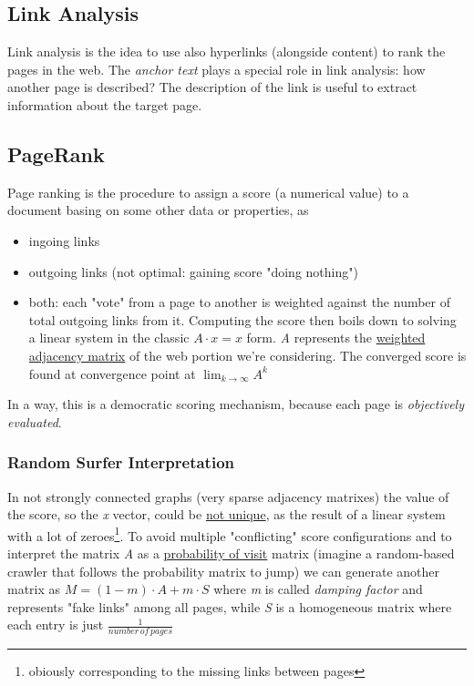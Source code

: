 \documentclass{article}
\begin{document}
		\subsection{Link Analysis}
			Link analysis is the idea to use also hyperlinks (alongside content) to rank the pages in the web. The \textit{anchor text} plays a special role in link analysis: how another page is described? The description of the link is useful to extract information about the target page.

		\subsection{PageRank}
			Page ranking is the procedure to assign a score (a numerical value) to a document basing on some other data or properties, as
			\begin{itemize}
				\item ingoing links
				\item outgoing links (not optimal: gaining score "doing nothing")
				\item both: each "vote" from a page to another is weighted against the number of total outgoing links from it. Computing the score then boils down to solving a linear system in the classic $A \cdot x = x$ form. \emph{A} represents the \underline{weighted adjacency matrix} of the web portion we're considering. The converged score is found at convergence point at $\lim_{k \rightarrow \infty} A^k$
			\end{itemize}
			In a way, this is a democratic scoring mechanism, because each page is \textit{objectively evaluated}.

			\subsubsection{Random Surfer Interpretation}
				In not strongly connected graphs (very sparse adjacency matrixes) the value of the score, so the \emph{x} vector, could be \underline{not unique}, as the result of a linear system with a lot of zeroes\footnote{obiously corresponding to the missing links between pages}. To avoid multiple "conflicting" score configurations and to interpret the matrix \emph{A} as a \underline{probability of visit} matrix (imagine a random-based crawler that follows the probability matrix to jump) we can generate another matrix as $M = (1-m) \cdot A + m \cdot S$ where \emph{m} is called \textit{damping factor} and represents "fake links" among all pages, while \emph{S} is a homogeneous matrix where each entry is just $\frac{1}{number\,of\, pages}$
\end{document}
